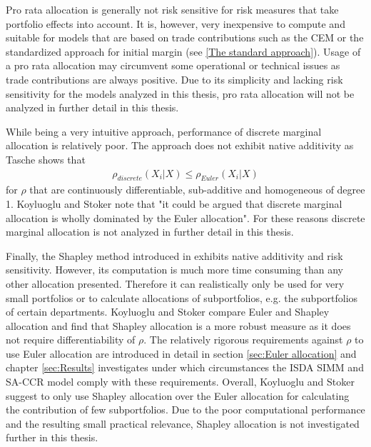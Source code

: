 \documentclass[../Thesis_AHoecherl.tex]{subfiles}
\begin{document}
Pro rata allocation is generally not risk sensitive for risk measures that take portfolio effects into account.
It is, however, very inexpensive to compute and suitable for models that are based on trade contributions such as the \gls{CEM} or the standardized approach for initial margin (see \ref{The standard approach}).
Usage of a pro rata allocation may circumvent some operational or technical issues as trade contributions are always positive.
Due to its simplicity and lacking risk sensitivity for the models analyzed in this thesis, pro rata allocation will not be analyzed in further detail in this thesis.

While being a very intuitive approach, performance of discrete marginal allocation is relatively poor. The approach does not exhibit native additivity as Tasche \cite{tasche2007} shows that 
\begin{align*}
    \rho_{discrete}\left(X_i|X\right) \leq \rho_{Euler}\left(X_i|X\right)
\end{align*}
for $\rho$ that are continuously differentiable, sub-additive and homogeneous of degree 1. 
Koyluoglu and Stoker \cite{koyluoglu2002risk} note that "it could be argued that discrete marginal allocation is wholly dominated by the Euler allocation". For these reasons discrete marginal allocation is not analyzed in further detail in this thesis.

Finally, the Shapley method introduced in \cite{shapley1951} exhibits native additivity and risk sensitivity.
However, its computation is much more time consuming than any other allocation presented. 
Therefore it can realistically only be used for very small portfolios or to calculate allocations of subportfolios, e.g. the subportfolios of certain departments.
Koyluoglu and Stoker \cite{koyluoglu2002risk} compare Euler and Shapley allocation and find that Shapley allocation is a more robust measure as it does not require differentiability of $\rho$. The relatively rigorous requirements against $\rho$ to use Euler allocation are introduced in detail in section \ref{sec:Euler allocation} and chapter \ref{sec:Results} investigates under which circumstances the ISDA SIMM and SA-CCR model comply with these requirements.
Overall, Koyluoglu and Stoker suggest to only use Shapley allocation over the Euler allocation for calculating the contribution of few subportfolios.
Due to the poor computational performance and the resulting small practical relevance, Shapley allocation is not investigated further in this thesis.
\end{document}
